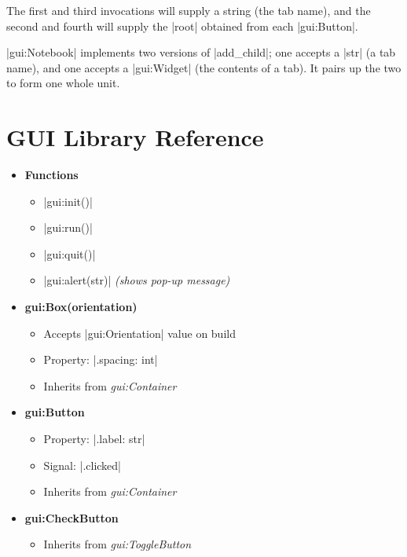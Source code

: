\documentclass[11pt]{report}
\begin{document}
The first and third invocations will supply a string (the tab name), and the second and fourth will supply the |root| obtained from each |gui:Button|.

|gui:Notebook| implements two versions of |add_child|; one accepts a |str| (a tab name), and one accepts a |gui:Widget| (the contents of a tab). It pairs up the two to form one whole unit.

\section{GUI Library Reference}

\vspace{-0.5cm}
\setlength{\columnsep}{0cm}
\begin{multicols}{2}
\begin{itemize}[topsep=0pt,leftmargin=*]
    \item \textbf{Functions}
    \begin{itemize}[nosep,topsep=0pt,leftmargin=*]
    \item |gui:init()|
    \item |gui:run()|
    \item |gui:quit()|
    \item |gui:alert(str)| \emph{(shows pop-up message)}
    \end{itemize}
    \item \textbf{gui:Box(orientation)}
    \begin{itemize}[nosep,topsep=0pt,leftmargin=*]
    \item Accepts |gui:Orientation| value on build
    \item Property: |.spacing: int|
    \item Inherits from \emph{gui:Container}
    \end{itemize}
    \item \textbf{gui:Button}
    \begin{itemize}[nosep,topsep=0pt,leftmargin=*]
    \item Property: |.label: str|
    \item Signal: |.clicked|
    \item Inherits from \emph{gui:Container}
    \end{itemize}
    \item \textbf{gui:CheckButton}
    \begin{itemize}[nosep,topsep=0pt,leftmargin=*]
    \item Inherits from \emph{gui:ToggleButton}
    \end{itemize}

\end{itemize}
\end{multicols}
\end{document}
